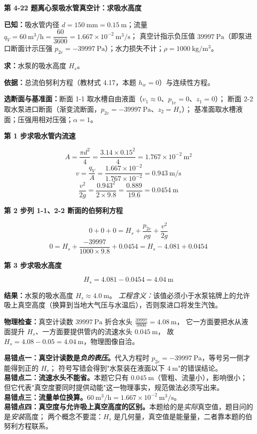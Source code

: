 \noindent\textbf{第 4-22 题\quad 离心泵吸水管真空计：求吸水高度}

\begin{jie}
\textbf{已知：}吸水管内径 $d=150\ \mathrm{mm}=0.15\ \mathrm{m}$；流量 $q_V=60\ \mathrm{m^3/h}=\dfrac{60}{3600}=1.667\times10^{-2}\ \mathrm{m^3/s}$；
真空计指示负压值 $39997\ \mathrm{Pa}$（即泵进口断面计示压强 $p_{2e}=-39997\ \mathrm{Pa}$）；水力损失不计；$\rho=1000\ \mathrm{kg/m^3}$。

\textbf{求：}水泵的吸水高度 $H_s$。

\textbf{依据：}总流伯努利方程（教材式 4.17，本题 $h_w=0$）与连续性方程。

\textbf{选断面与基准面：}断面 1-1 取水槽自由液面（$v_1\approx0$、$p_{1e}=0$、$z_1=0$）；
断面 2-2 取水泵进口断面（渐变流断面，$p_{2e}=-39997\ \mathrm{Pa}$、$z_2=H_s$）；
基准面取水槽液面；压强用相对压强；$\alpha=1$。

\textbf{第 1 步\quad 求吸水管内流速}

\[ A=\frac{\pi d^2}{4}=\frac{3.14\times0.15^2}{4}=1.767\times10^{-2}\ \mathrm{m^2} \]
\[ v=\frac{q_V}{A}=\frac{1.667\times10^{-2}}{1.767\times10^{-2}}=0.943\ \mathrm{m/s} \]
\[ \frac{v^2}{2g}=\frac{0.943^2}{2\times9.8}=\frac{0.889}{19.6}=0.0454\ \mathrm{m} \]

\textbf{第 2 步\quad 列 1-1、2-2 断面的伯努利方程}

\[ 0+0+0=H_s+\frac{p_{2e}}{\rho g}+\frac{v^2}{2g} \]
\[ 0=H_s+\frac{-39997}{1000\times9.8}+0.0454=H_s-4.081+0.0454 \]

\textbf{第 3 步\quad 求吸水高度}

\[ H_s=4.081-0.0454=4.04\ \mathrm{m} \]

\textbf{结果：}水泵的吸水高度 $H_s\approx4.0\ \mathrm{m}$。
\emph{工程含义：}该值必须小于水泵铭牌上的允许吸上真空高度（换算到当地大气压与水温后），否则泵进口将发生汽蚀。

\textbf{物理检查：}真空计读数 $39997\ \mathrm{Pa}$ 折合水头 $\frac{39997}{9800}=4.08\ \mathrm{m}$，
它一方面要把水从液面提升 $H_s$、一方面要提供管内的流速水头 $0.045\ \mathrm{m}$，
故 $H_s=4.08-0.05=4.04\ \mathrm{m}$，物理图像自洽。
\end{jie}

\begin{yicuo}
\textbf{易错点一：真空计读数是\emph{负的表压}。}代入方程时 $p_{2e}=-39997\ \mathrm{Pa}$，等号另一侧才能得到正的 $H_s$；
符号写错会得到"水泵装在液面以下 $4\ \mathrm{m}$"的错误结论。\\
\textbf{易错点二：流速水头不能省。}本题它只有 $0.045\ \mathrm{m}$（管粗、流量小），影响很小；
但它代表"真空度要同时提供动能"这一物理事实，规范做法必须写出来。\\
\textbf{易错点三：流量单位换算。}$60\ \mathrm{m^3/h}=1.667\times10^{-2}\ \mathrm{m^3/s}$。\\
\textbf{易错点四：真空度与允许吸上真空高度的区别。}本题给的是\emph{实际}真空值，题目问的是\emph{安装}高度；
两个概念不要混：$H_s$ 是几何量，真空值是能量量，二者靠本题的伯努利方程联系。
\end{yicuo}

